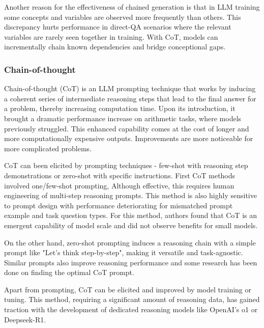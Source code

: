 Another reason for the effectiveness of chained generation is that in LLM training
some concepts and variables are observed more frequently than others\cite{prystawski2023thinkstepstepreasoning}. 
This discrepancy hurts performance in direct-QA scenarios where the relevant
variables are rarely seen together in training. With CoT, models can incrementally chain known dependencies and bridge conceptional gaps.

\subsubsection{Chain-of-thought}\label{sec:cot}
Chain-of-thought\cite{wei2023chainofthoughtpromptingelicitsreasoning} (CoT) is an LLM prompting technique that works by inducing a coherent series of intermediate 
reasoning steps that lead to the final answer for a problem, thereby increasing computation time. 
Upon its introduction, it brought a dramatic performance increase on arithmetic tasks, where models previously struggled.
This enhanced capability comes at the cost of longer and more computationally expensive outputs\cite{brown2024largelanguagemonkeysscaling}. 
Improvements are more noticeable for more complicated problems\cite{wei2023chainofthoughtpromptingelicitsreasoning}. 

CoT can been elicited by prompting techniques - few-shot with reasoning step demonstrations or 
zero-shot with specific instructions\cite{wang2024chainofthoughtreasoningprompting}.
First CoT methods\cite{wei2023chainofthoughtpromptingelicitsreasoning} involved one/few-shot prompting, 
Although effective, this requires human engineering of multi-step reasoning prompts.
This method is also highly sensitive to prompt design with performance deteriorating 
for mismatched prompt example and task question types\cite{NEURIPS2022_8bb0d291}.
For this method, authors found that CoT is an emergent capability of model scale 
and did not observe benefits for small models\cite{wei2023chainofthoughtpromptingelicitsreasoning}.

On the other hand, zero-shot prompting induces a reasoning chain with a simple prompt like "Let's think step-by-step",
making it versatile and task-agnostic\cite{NEURIPS2022_8bb0d291}. Similar prompts also improve reasoning performance and 
some research\cite{yang2024largelanguagemodelsoptimizers} has been done on finding the optimal CoT prompt.

Apart from prompting, CoT can be elicited and improved by model training or tuning. 
This method, requiring a significant amount of reasoning data\cite{wang2024chainofthoughtreasoningprompting},
has gained traction with the development of dedicated reasoning models like OpenAI's o1\cite{openai2024openaio1card} or Deepseek-R1\cite{deepseekai2025deepseekr1incentivizingreasoningcapability}.

